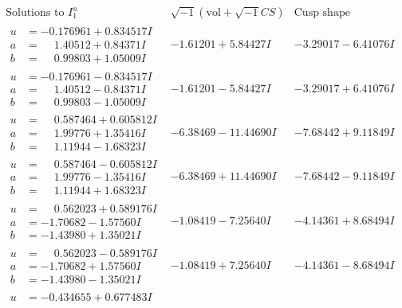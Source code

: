 \documentclass[1p]{elsarticle_modified}
\theoremstyle{definition}
\newcommand{\I}{\sqrt{-1}}
\begin{document}
$$\begin{array}{c|c|c}  
\text{Solutions to }I^u_{1}& \I (\text{vol} + \sqrt{-1}CS) & \text{Cusp shape}\\
 \hline 
\begin{aligned}
u &= -0.176961 + 0.834517 I \\
a &= \phantom{-}1.40512 + 0.84371 I \\
b &= \phantom{-}0.99803 + 1.05009 I\end{aligned}
 & -1.61201 + 5.84427 I & -3.29017 - 6.41076 I \\ \hline\begin{aligned}
u &= -0.176961 - 0.834517 I \\
a &= \phantom{-}1.40512 - 0.84371 I \\
b &= \phantom{-}0.99803 - 1.05009 I\end{aligned}
 & -1.61201 - 5.84427 I & -3.29017 + 6.41076 I \\ \hline\begin{aligned}
u &= \phantom{-}0.587464 + 0.605812 I \\
a &= \phantom{-}1.99776 + 1.35416 I \\
b &= \phantom{-}1.11944 - 1.68323 I\end{aligned}
 & -6.38469 - 11.44690 I & -7.68442 + 9.11849 I \\ \hline\begin{aligned}
u &= \phantom{-}0.587464 - 0.605812 I \\
a &= \phantom{-}1.99776 - 1.35416 I \\
b &= \phantom{-}1.11944 + 1.68323 I\end{aligned}
 & -6.38469 + 11.44690 I & -7.68442 - 9.11849 I \\ \hline\begin{aligned}
u &= \phantom{-}0.562023 + 0.589176 I \\
a &= -1.70682 - 1.57560 I \\
b &= -1.43980 + 1.35021 I\end{aligned}
 & -1.08419 - 7.25640 I & -4.14361 + 8.68494 I \\ \hline\begin{aligned}
u &= \phantom{-}0.562023 - 0.589176 I \\
a &= -1.70682 + 1.57560 I \\
b &= -1.43980 - 1.35021 I\end{aligned}
 & -1.08419 + 7.25640 I & -4.14361 - 8.68494 I \\ \hline\begin{aligned}
u &= -0.434655 + 0.677483 I \\

\end{aligned}
\end{array}$$
\end{document}
